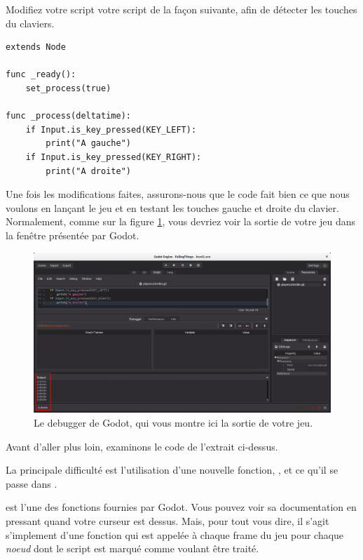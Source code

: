 Modifiez votre script votre script de la façon suivante, afin de détecter les touches du claviers.

\begin{lstlisting}
extends Node

func _ready():
    set_process(true)

func _process(deltatime):
    if Input.is_key_pressed(KEY_LEFT):
        print("A gauche")
    if Input.is_key_pressed(KEY_RIGHT):
        print("A droite")
\end{lstlisting}

Une fois les modifications faites, assurons-nous que le code fait bien ce que nous voulons en lançant le jeu et en testant les touches gauche et droite du clavier. Normalement, comme sur la figure \ref{lvl1-output}, vous devriez voir la sortie de votre jeu dans la fenêtre présentée par Godot. 

\begin{figure}
  \begin{center}
    \includegraphics[width=12cm]{img/lvl1-output.png}
  \end{center}
  \caption{\label{lvl1-output} Le debugger de Godot, qui vous montre ici la sortie de votre jeu.}
\end{figure}

Avant d'aller plus loin, examinons le code de l'extrait ci-dessus.

La principale difficulté est l'utilisation d'une nouvelle fonction, , et ce qu'il se passe dans .

 est l'une des fonctions fournies par Godot. Vous pouvez voir sa documentation en pressant  quand votre curseur est dessus. Mais, pour tout vous dire, il s'agit s'implement d'une fonction qui est appelée à chaque frame du jeu pour chaque \emph{noeud} dont le script est marqué comme voulant être traité.

